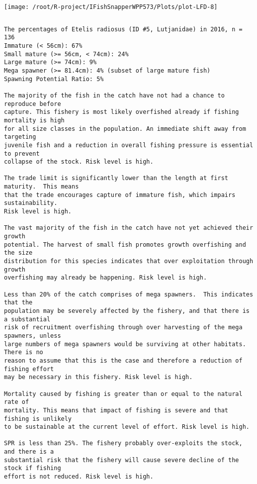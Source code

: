 \documentclass{report}\usepackage[]{graphicx}\usepackage[]{color}
\makeatletter
\def\maxwidth{ %
  \ifdim\Gin@nat@width>\linewidth
    \linewidth
  \else
    \Gin@nat@width
  \fi
}
\newenvironment{kframe}{%
 \def\at@end@of@kframe{}%
 \ifinner\ifhmode%
  \def\at@end@of@kframe{\end{minipage}}%
  \begin{minipage}{\columnwidth}%
 \fi\fi%
 \def\FrameCommand##1{\hskip\@totalleftmargin \hskip-\fboxsep
 \colorbox{shadecolor}{##1}\hskip-\fboxsep
     \hskip-\linewidth \hskip-\@totalleftmargin \hskip\columnwidth}%
 \MakeFramed {\advance\hsize-\width
   \@totalleftmargin\z@ \linewidth\hsize
   \@setminipage}}%
 {\par\unskip\endMakeFramed%
 \at@end@of@kframe}
\newenvironment{knitrout}{}{} %
\makeatother
\begin{document}
\begin{knitrout}
\texttt{[image: /root/R-project/IFishSnapperWPP573/Plots/plot-LFD-8]} 
\begin{kframe}\begin{verbatim}
\end{verbatim}
\end{kframe}
\clearpage
\newpage
\begin{kframe}\begin{verbatim}The percentages of Etelis radiosus (ID #5, Lutjanidae) in 2016, n = 136
Immature (< 56cm): 67%
Small mature (>= 56cm, < 74cm): 24%
Large mature (>= 74cm): 9%
Mega spawner (>= 81.4cm): 4% (subset of large mature fish)
Spawning Potential Ratio: 5%
 
The majority of the fish in the catch have not had a chance to reproduce before
capture. This fishery is most likely overfished already if fishing mortality is high
for all size classes in the population. An immediate shift away from targeting
juvenile fish and a reduction in overall fishing pressure is essential to prevent
collapse of the stock. Risk level is high.

The trade limit is significantly lower than the length at first maturity.  This means
that the trade encourages capture of immature fish, which impairs sustainability.
Risk level is high.

The vast majority of the fish in the catch have not yet achieved their growth
potential. The harvest of small fish promotes growth overfishing and the size
distribution for this species indicates that over exploitation through growth
overfishing may already be happening. Risk level is high.

Less than 20% of the catch comprises of mega spawners.  This indicates that the
population may be severely affected by the fishery, and that there is a substantial
risk of recruitment overfishing through over harvesting of the mega spawners, unless
large numbers of mega spawners would be surviving at other habitats. There is no
reason to assume that this is the case and therefore a reduction of fishing effort
may be necessary in this fishery. Risk level is high.
 
Mortality caused by fishing is greater than or equal to the natural rate of
mortality. This means that impact of fishing is severe and that fishing is unlikely
to be sustainable at the current level of effort. Risk level is high.
 
SPR is less than 25%. The fishery probably over-exploits the stock, and there is a
substantial risk that the fishery will cause severe decline of the stock if fishing
effort is not reduced. Risk level is high.
 

\end{verbatim}
\end{kframe}
\end{knitrout}
\end{document}
